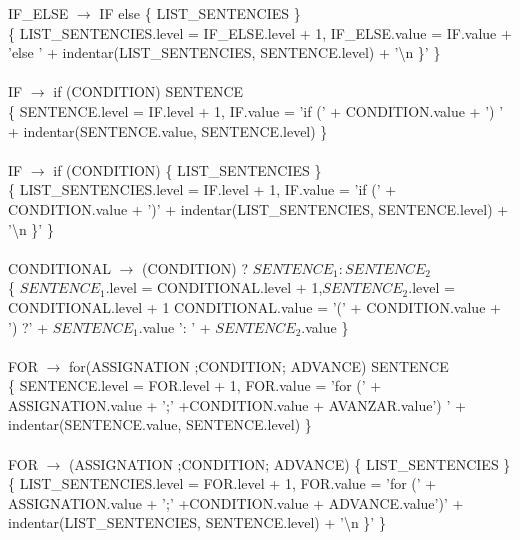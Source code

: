 \documentclass[10pt,a4paper]{article}
\begin{document}
IF\_ELSE $\rightarrow$ IF else \{ LIST\_SENTENCIES \}  \\

\{ LIST\_SENTENCIES.level = IF\_ELSE.level + 1, IF\_ELSE.value = IF.value + 'else {' + indentar(LIST\_SENTENCIES, SENTENCE.level) + '\textbackslash{}n \}' \} \\ \\


IF $\rightarrow$ if (CONDITION) SENTENCE   \\

\{ SENTENCE.level = IF.level + 1, IF.value = 'if (' + CONDITION.value + ') ' + indentar(SENTENCE.value, SENTENCE.level) \}  \\ \\

IF $\rightarrow$ if (CONDITION) \{ LIST\_SENTENCIES \}  \\

\{ LIST\_SENTENCIES.level = IF.level + 1, IF.value = 'if (' + CONDITION.value + '){' + indentar(LIST\_SENTENCIES, SENTENCE.level) + '\textbackslash{}n \}' \} \\ \\


CONDITIONAL $\rightarrow$ (CONDITION) ? $SENTENCE_{1} : SENTENCE_{2}$  \\

\{ $SENTENCE_{1}$.level = CONDITIONAL.level + 1,$SENTENCE_{2}$.level = CONDITIONAL.level + 1 CONDITIONAL.value = '(' + CONDITION.value + ') ?' + $SENTENCE_{1}$.value ': '  + $SENTENCE_{2}$.value \} \\ \\

FOR $\rightarrow$ for(ASSIGNATION ;CONDITION; ADVANCE) SENTENCE  \\

\{ SENTENCE.level = FOR.level + 1, FOR.value = 'for (' + ASSIGNATION.value + ';' +CONDITION.value + AVANZAR.value') ' + indentar(SENTENCE.value, SENTENCE.level) \} \\ \\


FOR $\rightarrow$ (ASSIGNATION ;CONDITION; ADVANCE) \{ LIST\_SENTENCIES \} \\ 

\{ LIST\_SENTENCIES.level = FOR.level + 1, FOR.value = 'for (' + ASSIGNATION.value + ';' +CONDITION.value + ADVANCE.value'){' + indentar(LIST\_SENTENCIES, SENTENCE.level) + '\textbackslash{}n \}' \} \\ \\


}}}
\end{document}
